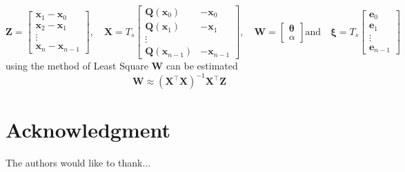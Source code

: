\documentclass[onecolumn,draftcls]{IEEEtran}
\begin{document}
\begin{equation}
 \mathbf Z=\begin{bmatrix} \mathbf x_{1}-\mathbf x_{0}\\\mathbf x_{2}-\mathbf x_{1}\\\vdots\\\mathbf x_{n}-\mathbf x_{n-1}\end{bmatrix},\quad \mathbf X=T_s\begin{bmatrix}\mathbf Q(\mathbf x_0)&-\mathbf x_{0}\\\mathbf Q(\mathbf x_1)&-\mathbf x_{1}\\\vdots\\ \mathbf Q(\mathbf x_{n-1})&-\mathbf x_{n-1}\end{bmatrix},\quad \mathbf W=\begin{bmatrix}\mathbf \theta \\ \alpha\end{bmatrix} \text{and}\quad \boldsymbol \xi=T_s\begin{bmatrix}\mathbf e_0\\\mathbf e_1\\\vdots\\\mathbf e_{n-1}\end{bmatrix}
\end{equation}
using the method of Least Square $ \mathbf W$ can be estimated
\begin{equation}
 \mathbf W\approx(\mathbf X^\top\mathbf X)^{-1}\mathbf X^\top\mathbf Z
\end{equation}
\section*{Acknowledgment}
The authors would like to thank...

\ifCLASSOPTIONcaptionsoff
  \newpage
\fi








%
\end{document}
